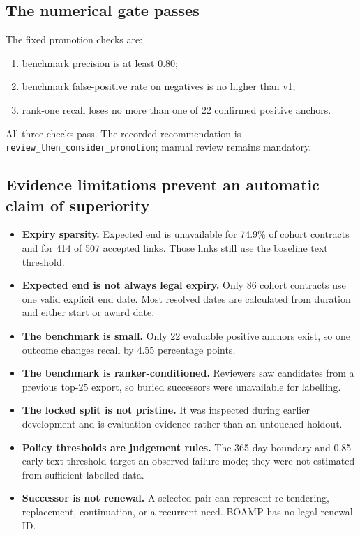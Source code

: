 \documentclass[11pt,a4paper]{article}
\newcommand{\code}[1]{\texttt{\small #1}}
\begin{document}
\subsection{The numerical gate passes}

The fixed promotion checks are:

\begin{enumerate}
  \item benchmark precision is at least 0.80;
  \item benchmark false-positive rate on negatives is no higher than v1;
  \item rank-one recall loses no more than one of 22 confirmed positive anchors.
\end{enumerate}

All three checks pass. The recorded recommendation is
\code{review\_then\_consider\_promotion}; manual review remains mandatory.

\subsection{Evidence limitations prevent an automatic claim of superiority}

\begin{itemize}
  \item \textbf{Expiry sparsity.} Expected end is unavailable for 74.9\% of cohort
  contracts and for 414 of 507 accepted links. Those links still use the baseline
  text threshold.
  \item \textbf{Expected end is not always legal expiry.} Only 86 cohort contracts use
  one valid explicit end date. Most resolved dates are calculated from duration and
  either start or award date.
  \item \textbf{The benchmark is small.} Only 22 evaluable positive anchors exist, so
  one outcome changes recall by 4.55 percentage points.
  \item \textbf{The benchmark is ranker-conditioned.} Reviewers saw candidates from a
  previous top-25 export, so buried successors were unavailable for labelling.
  \item \textbf{The locked split is not pristine.} It was inspected during earlier
  development and is evaluation evidence rather than an untouched holdout.
  \item \textbf{Policy thresholds are judgement rules.} The 365-day boundary and
  0.85 early text threshold target an observed failure mode; they were not estimated
  from sufficient labelled data.
  \item \textbf{Successor is not renewal.} A selected pair can represent re-tendering,
  replacement, continuation, or a recurrent need. BOAMP has no legal renewal ID.
\end{itemize}
\end{document}

